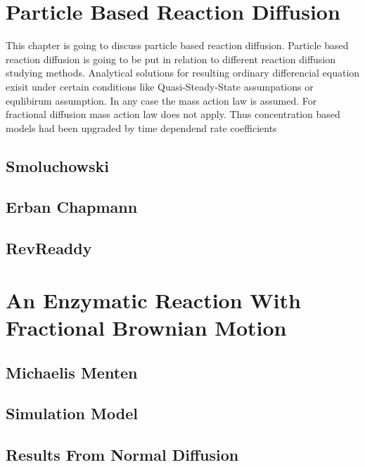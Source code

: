 \documentclass[
  a4paper,BCOR10mm,oneside,
  bibtotoc,idxtotoc,
  headsepline,footsepline,%
  fleqn,openbib
]{scrbook}
\begin{document}
\chapter{Particle Based Reaction Diffusion}
This chapter is going to discuss particle based reaction diffusion. Particle based reaction diffusion is going to be put in relation to different reaction diffusion studying methods.  
Analytical solutions for resulting ordinary differencial equation exisit under certain conditions like Quasi-Steady-State assumpations or equlibirum assumption. In any case the mass action law is assumed. For fractional diffusion mass action law does not apply. Thus concentration based models had been upgraded by time dependend rate coefficients \cite{Berry2002}  \cite{schnell2004reaction}
\section{Smoluchowski}
\section{Erban Chapmann}
\section{RevReaddy}
\chapter{An Enzymatic Reaction With Fractional Brownian Motion}
\section{Michaelis Menten}
\section{Simulation Model}
\section{Results From Normal Diffusion}
\end{document}
